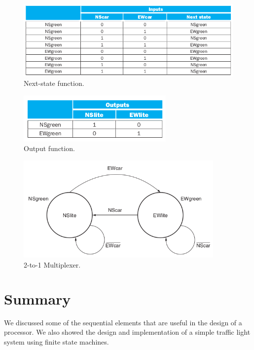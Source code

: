 \documentclass[a4paper, 11pt,oneside]{article}
\begin{document}
\begin{figure}[H]
	\begin{center}
	\includegraphics[width=4.5in]{fsm1.png}
	\caption{Next-state function.}
	\label{fig:fsm1} 
	\end{center}
\end{figure}

\begin{figure}[H]
	\begin{center}
	\includegraphics[width=3in]{fsm2.png}
	\caption{Output function.}
	\label{fig:fsm2} 
	\end{center}
\end{figure}



\begin{figure}[H]
	\begin{center}
	\includegraphics[width=4in]{fsm3.png}
	\caption{2-to-1 Multiplexer.}
	\label{fig:mux} 
	\end{center}
\end{figure}


\section{Summary}
We discussed some of the sequential elements that are useful in the design of a 
processor. We also showed the design and implementation of a simple traffic 
light system using finite state machines.
\end{document}
